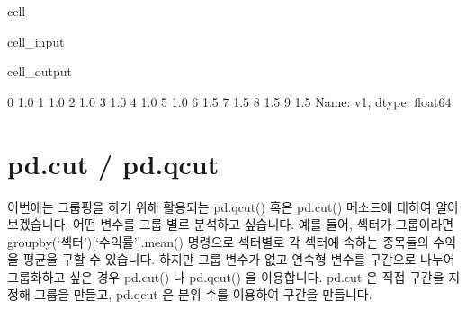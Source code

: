\documentclass[letterpaper,10pt,english]{jupyterBook}
\begin{document}
\begin{sphinxuseclass}{cell}\begin{sphinxVerbatimInput}

\begin{sphinxuseclass}{cell_input}
\begin{sphinxVerbatim}[commandchars=\\\{\}]
\PYG{p}{[}\PYG{p}{]}    
\end{sphinxVerbatim}

\end{sphinxuseclass}\end{sphinxVerbatimInput}
\begin{sphinxVerbatimOutput}

\begin{sphinxuseclass}{cell_output}
\begin{sphinxVerbatim}[commandchars=\\\{\}]
0    1.0
1    1.0
2    1.0
3    1.0
4    1.0
5    1.0
6    1.5
7    1.5
8    1.5
9    1.5
Name: v1, dtype: float64
\end{sphinxVerbatim}

\end{sphinxuseclass}\end{sphinxVerbatimOutput}

\end{sphinxuseclass}

\section{pd.cut / pd.qcut}
\label{\detokenize{chapter2/2.2.3_Useful_Techniques:br-pd-cut-pd-qcut}}
\sphinxAtStartPar
이번에는 그룹핑을 하기 위해 활용되는 pd.qcut() 혹은 pd.cut() 메소드에 대하여 알아보겠습니다. 어떤 변수를 그룹 별로 분석하고 싶습니다. 예를 들어, 섹터가 그룹이라면 groupby(‘섹터’){[}‘수익률’{]}.mean() 명령으로 섹터별로 각 섹터에 속하는 종목들의 수익율 평균울 구할 수 있습니다. 하지만 그룹 변수가 없고 연속형 변수를 구간으로 나누어 그룹화하고 싶은 경우 pd.cut() 나 pd.qcut() 을 이용합니다. pd.cut 은 직접 구간을 지정해 그룹을 만들고, pd.qcut 은 분위 수를 이용하여 구간을 만듭니다.
\end{document}
